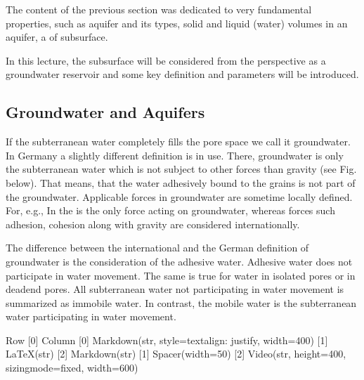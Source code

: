 \documentclass[letterpaper,10pt,english]{sphinxmanual}
\let\sphinxpxdimen\pdfpxdimen\else\newdimen\sphinxpxdimen
\begin{document}
The content of the previous section was dedicated to very fundamental properties, such as aquifer and its types, solid and liquid (water) volumes in an aquifer, a of subsurface.

In this lecture, the subsurface will be considered from the perspective as a groundwater reservoir and some key definition and parameters will be introduced.


\subsection{Groundwater and Aquifers}
\label{\detokenize{contents/flow/lecture_03/13_gw_storage:groundwater-and-aquifers}}
If the subterranean water completely fills the pore space we call it groundwater. In Germany a slightly different definition is in use. There, groundwater is only the subterranean water which is not subject to other forces than gravity (see Fig. below). That means, that the water adhesively bound to the grains is not part of the groundwater. Applicable forces in groundwater are sometime locally defined. For, e.g., In  the  is the only force acting on groundwater, whereas forces such adhesion, cohesion along with gravity are considered internationally.

\noindent{\hspace*{\fill}\sphinxincludegraphics[width=500\sphinxpxdimen]{{L03_f_1}.png}\hspace*{\fill}}

The difference between the international and the German definition of groundwater is the consideration of the adhesive water. Adhesive water does not participate in water movement. The same is true for water in isolated pores or in dead\sphinxhyphen{}end pores. All subterranean water not participating in water movement is summarized as immobile water. In contrast, the mobile water is the subterranean water participating in water movement.

\begin{sphinxVerbatim}[commandchars=\\\{\}]
Row
    [0] Column
        [0] Markdown(str, style=\PYGZob{}\PYGZsq{}text\PYGZhy{}align\PYGZsq{}: \PYGZsq{}justify\PYGZsq{}\PYGZcb{}, width=400)
        [1] LaTeX(str)
        [2] Markdown(str)
    [1] Spacer(width=50)
    [2] Video(str, height=400, sizing\PYGZus{}mode=\PYGZsq{}fixed\PYGZsq{}, width=600)
\end{sphinxVerbatim}
\end{document}
